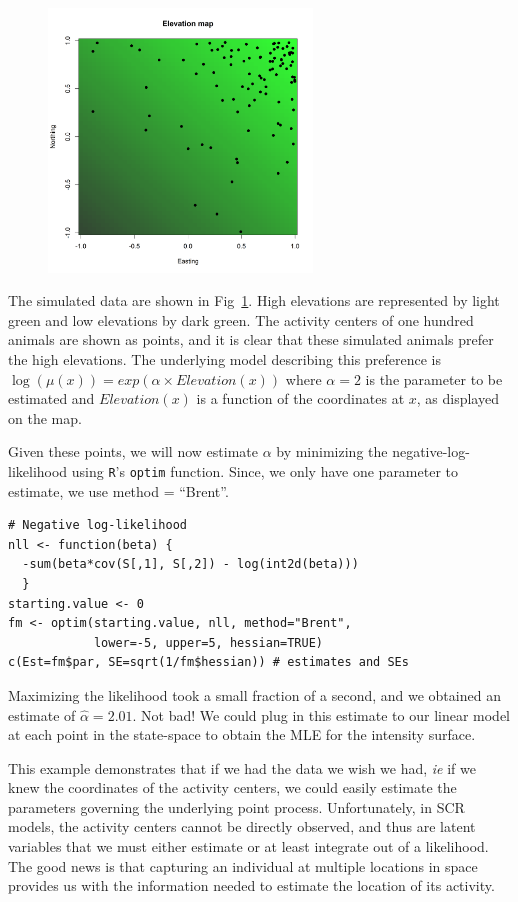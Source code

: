 \documentclass{book}
\begin{document}
\begin{figure}
\centering
\includegraphics[width=7cm,height=7cm]{figs/elevMap}
\label{fig:elevMap}
\end{figure}

The simulated data are shown in Fig~\ref{fig:elevMap}. High elevations
are represented by light green and low elevations by dark green. The
activity centers of one hundred animals are shown as
points, and it is clear that these simulated animals prefer the high
elevations.  The underlying model describing this preference is
$\log(\mu(x)) = exp(\alpha \times Elevation(x))$
where $\alpha=2$ is the parameter to be estimated and $Elevation(x)$
is a function of the coordinates at $x$, as displayed on the map.

Given these points, we will now estimate $\alpha$ by minimizing the
negative-log-likelihood using \verb+R+'s \verb+optim+ function. Since,
we only have one parameter to estimate, we use method = ``Brent''.

\begin{small}
\begin{verbatim}
# Negative log-likelihood
nll <- function(beta) {
  -sum(beta*cov(S[,1], S[,2]) - log(int2d(beta)))
  }
starting.value <- 0
fm <- optim(starting.value, nll, method="Brent",
            lower=-5, upper=5, hessian=TRUE)
c(Est=fm$par, SE=sqrt(1/fm$hessian)) # estimates and SEs
\end{verbatim}
\end{small}


Maximizing the likelihood took a small fraction of a second, and we
obtained an estimate of $\hat{\alpha}=2.01$. Not bad! We could plug in
this estimate to our linear model at each point in the state-space to
obtain the MLE for the intensity surface.

This example demonstrates
that if we had the data we wish we had, {\it ie} if we knew the
coordinates of the activity centers, we could easily estimate the
parameters governing the underlying point process. Unfortunately, in
SCR models, the activity centers cannot be directly observed, and thus
are latent variables that we must either estimate or at least integrate out
of a likelihood. The good news is that capturing an individual at
multiple locations in space provides us with the information needed to
estimate the location of its activity.
\end{document}
